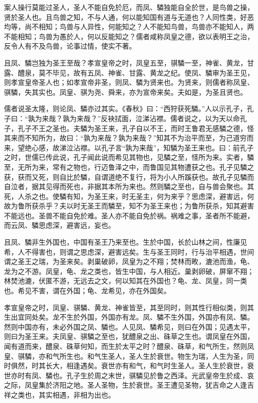 \documentclass[]{article}
\begin{document}
案人操行莫能过圣人，圣人不能自免於厄，而凤、驎独能自全於世，是鸟兽之操，贤於圣人也。且鸟兽之知，不与人通，何以能知国有道与无道也？人同性类，好恶均等，尚不相知；鸟兽与人异性，何能知之？人不能知鸟兽，鸟兽亦不能知人，两不能相知；鸟兽为愚於人，何以反能知之？儒者咸称凤皇之德，欲以表明王之治，反令人有不及鸟兽，论事过情，使实不著。

且凤、驎岂独为圣王至哉？孝宣皇帝之时，凤皇五至，骐驎一至，神雀、黄龙，甘露、醴泉，莫不毕见，故有五凤、神雀、甘露、黄龙之纪。使凤、驎审为圣王见，则孝宣皇帝圣人也；如孝宣帝非圣，则凤、驎为贤来也。为贤来，则儒者称凤皇、骐驎，失其实也。凤皇、骐为尧、舜来，亦为宣帝来矣。夫如是，为圣且贤也。

儒者说圣太隆，则论凤、驎亦过其实。《春秋》曰：``西狩获死驎。''人以示孔子，孔子曰：``孰为来哉？孰为来哉？''反袂拭面，泣涕沾襟。儒者说之，以为天以命孔子，孔子不王之圣也。夫驎为圣王来，孔子自以不王，而时王鲁君无感驎之德，怪其来而不知所为，故曰：``孰为来哉？孰为来哉？''知其不为治平而至，为己道穷而来，望绝心感，故涕泣沾襟。以孔子言``孰为来哉''，知驎为圣王来也。曰：前孔子之时，世儒已传此说，孔子闻此说而希见其物也，见驎之至，怪所为来。实者，驎至，无所为来，常有之物也，行迈鲁泽之中，而鲁国见其物遭获之也。孔子见驎之获，获而又死，则自比於驎，自谓道绝不复行，将为小人所蹊获也。故孔子见驎而自泣者，据其见得而死也，非据其本所为来也。然则驎之至也，自与兽会聚也。其死，人杀之也。使驎有知，为圣王来，时无圣主，何为来乎？思虑深，避害远，何故为鲁所获杀乎？夫以时无圣王而驎至，知不为圣王来也；为鲁所获杀，知其避害不能远也。圣兽不能自免於难。圣人亦不能自免於祸。祸难之事，圣者所不能避，而云凤、驎思虑深，避害远，妄也。

且凤、驎非生外国也，中国有圣王乃来至也。生於中国，长於山林之间，性廉见希，人不得害也，则谓之思虑深，避害远矣。生与圣王同时，行与治平相遇，世间谓之圣王之瑞，为圣来矣。剥巢破卵，凤皇为之不翔；焚林而畋，漉池而渔，龟、龙为之不游。凤皇，龟、龙之类也，皆生中国，与人相近。巢剥卵破，屏窜不翔；林焚池漉，伏匿不游，无远去之文，何以知其在外国也？龟、龙、凤皇，同一类也。希见不害，谓在外国；龟、龙希见，亦在外国矣。

孝宣皇帝之时，凤皇、骐驎、黄龙、神雀皆至，其至同时，则其性行相似类，则其生出宜同处矣。龙不生於外国，外国亦有龙。凤、驎不生外国，外国亦有凤、驎。然则中国亦有，未必外国之凤、驎也。人见凤、驎希见，则曰在外国；见遇太平，则曰为圣王来。夫凤皇、骐驎之至也，犹醴泉之出、硃草之生也。谓凤皇在外国，闻有道而来，醴泉、硃草何知，而生於太平之时？醴泉、硃草，和气所生，然则凤皇、骐驎，亦和气所生也。和气生圣人，圣人生於衰世。物生为瑞，人生为圣，同时俱然，时其长大，相逢遇矣。衰世亦有和气，和气时生圣人。圣人生於衰世，衰世亦时有凤、驎也。孔子生於周之末世，骐驎见於鲁之西泽。光武皇帝生於成、哀之际，凤皇集於济阳之地。圣人圣物，生於衰世。圣王遭见圣物，犹吉命之人逢吉祥之类也，其实相遇，非相为出也。
\end{document}
